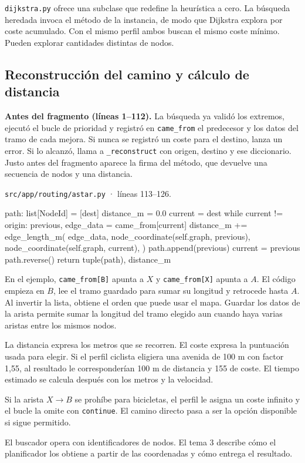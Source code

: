 \documentclass[11pt,a4paper]{article}
\begin{document}
\texttt{dijkstra.py} ofrece una subclase que redefine la heurística a cero. La búsqueda heredada invoca el método de la instancia, de modo que Dijkstra explora por coste acumulado. Con el mismo perfil ambos buscan el mismo coste mínimo. Pueden explorar cantidades distintas de nodos.

\subsection{Reconstrucción del camino y cálculo de distancia}

\textbf{Antes del fragmento (líneas 1--112).} La búsqueda ya validó los extremos, ejecutó el bucle de prioridad y registró en \texttt{came\_from} el predecesor y los datos del tramo de cada mejora. Si nunca se registró un coste para el destino, lanza un error. Si lo alcanzó, llama a \texttt{\_reconstruct} con origen, destino y ese diccionario. Justo antes del fragmento aparece la firma del método, que devuelve una secuencia de nodos y una distancia.

\par\medskip
\noindent\begin{minipage}{\linewidth}
{\footnotesize\nolinkurl{src/app/routing/astar.py} · líneas 113--126.\par}
\nopagebreak[4]
\begin{Codigo}[firstnumber=113]
        path: list[NodeId] = [dest]
        distance_m = 0.0
        current = dest
        while current != origin:
            previous, edge_data = came_from[current]
            distance_m += edge_length_m(
                edge_data,
                node_coordinate(self.graph, previous),
                node_coordinate(self.graph, current),
            )
            path.append(previous)
            current = previous
        path.reverse()
        return tuple(path), distance_m
\end{Codigo}
\end{minipage}\par

En el ejemplo, \texttt{came\_from[B]} apunta a \(X\) y \texttt{came\_from[X]} apunta a \(A\). El código empieza en \(B\), lee el tramo guardado para sumar su longitud y retrocede hasta \(A\). Al invertir la lista, obtiene el orden que puede usar el mapa. Guardar los datos de la arista permite sumar la longitud del tramo elegido aun cuando haya varias aristas entre los mismos nodos.

La distancia expresa los metros que se recorren. El coste expresa la puntuación usada para elegir. Si el perfil ciclista eligiera una avenida de 100 m con factor 1,55, al resultado le corresponderían 100 m de distancia y 155 de coste. El tiempo estimado se calcula después con los metros y la velocidad.

Si la arista \(X\to B\) se prohíbe para bicicletas, el perfil le asigna un coste infinito y el bucle la omite con \texttt{continue}. El camino directo pasa a ser la opción disponible si sigue permitido.

El buscador opera con identificadores de nodos. El tema 3 describe cómo el planificador los obtiene a partir de las coordenadas y cómo entrega el resultado.
\end{document}
